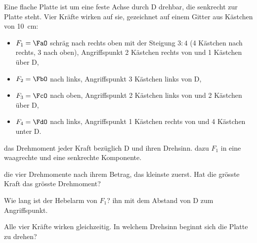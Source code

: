 Eine flache Platte ist um eine feste Achse durch D drehbar, die senkrecht zur Platte steht. Vier Kräfte wirken auf sie, gezeichnet auf einem Gitter aus Kästchen von \SI{10}{\cm}:
\begin{itemize}
 \item $F_1 = \FaO$ schräg nach rechts oben mit der Steigung $3:4$ (4 Kästchen nach rechts, 3 nach oben), Angriffspunkt 2 Kästchen rechts von und 1 Kästchen über D,
 \item $F_2 = \FbO$ nach links, Angriffspunkt 3 Kästchen links von D,
 \item $F_3 = \FcO$ nach oben, Angriffspunkt 2 Kästchen links von und 2 Kästchen über D,
 \item $F_4 = \FdO$ nach links, Angriffspunkt 1 Kästchen rechts von und 4 Kästchen unter D.
\end{itemize}
\begin{center}
\end{center}

\begin{abcliste}
\abc
{} das Drehmoment jeder Kraft bezüglich D und ihren Drehsinn.  dazu $F_1$ in eine waagrechte und eine senkrechte Komponente.

\abc
{} die vier Drehmomente nach ihrem Betrag, das kleinste zuerst. Hat die grösste Kraft das grösste Drehmoment?

\abc
Wie lang ist der Hebelarm von $F_1$?  ihn mit dem Abstand von D zum Angriffspunkt.

\abc
Alle vier Kräfte wirken gleichzeitig. In welchem Drehsinn beginnt sich die Platte zu drehen?
\end{abcliste}
